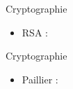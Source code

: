 \documentclass{beamer}
\begin{document}
  \begin{frame}{Cryptographie}

    \begin{itemize}
    \item<1-> {
      RSA :
              }
    \end{itemize}

  \end{frame}


  


  \begin{frame}{Cryptographie}

    \begin{itemize}
    \item<1-> {
      Paillier :
              }
    \end{itemize}

  \end{frame}
\end{document}
